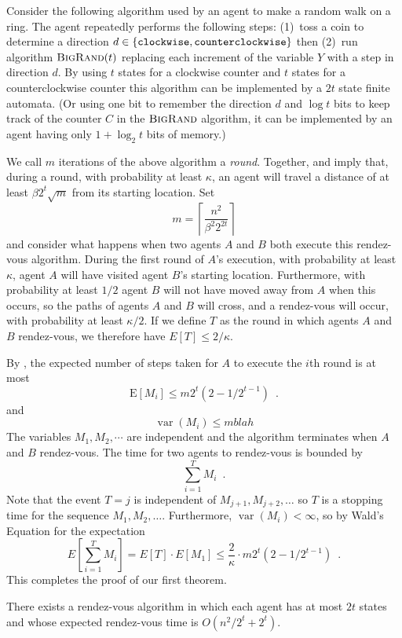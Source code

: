 \documentclass[lotsofwhite]{patmorin}
\newcommand{\bigrand}{\textsc{BigRand}}
\newcommand{\E}{\mathrm{E}}
\DeclareMathOperator{\var}{var}
\begin{document}
Consider the following algorithm used by an agent to make a random
walk on a ring.  The agent repeatedly performs the following steps:
(1)~toss a coin to determine a direction
$d\in\{\mbox{{\tt clockwise}},\mbox{{\tt counterclockwise}}\}$ then (2)~run
algorithm $\bigrand(t)$ replacing each increment of the variable
$Y$ with a step in direction $d$.  By using  $t$ states for 
a clockwise counter and $t$ states for a counterclockwise counter this algorithm
can be implemented by a $2t$ state finite automata. (Or using 
one bit to remember the
direction $d$ and $\log t$ bits to keep track of the counter $C$ in the
$\bigrand$ algorithm, it can be implemented by an agent
having only $1+\log_2 t$ bits of memory.) 

We call $m$ iterations of the above algorithm a \emph{round}.
Together,  and  imply that, during a
round, with probability at least $\kappa$, an agent will travel a
distance of at least $\beta 2^t \sqrt{m}$ from its starting
location.  Set
\[
   m= \left\lceil \frac{n^2}{\beta^2 2^{2t}} \right\rceil 
\]
and consider what happens when two agents $A$ and $B$ both execute
this rendez-vous algorithm.  During the first round of $A$'s
execution, with probability at least $\kappa$, agent $A$ will have
visited agent $B$'s starting location. Furthermore, with probability
at least $1/2$ agent $B$ will not have moved away from $A$ when this
occurs, so the paths of agents $A$ and $B$ will cross, and a
rendez-vous will occur, with probability at least $\kappa/2$.  If we
define $T$ as the round in which agents $A$ and $B$ rendez-vous, we
therefore have $E[T]\le 2/\kappa$.

By , the expected number of steps taken for $A$ to
execute the $i$th round is at most
\[
    \E[M_i] \le m 2^{t}(2-1/2^{t-1}) \enspace . 
\]
and
\[
    \var(M_i) \le m blah
\]
The variables $M_1,M_2,\cdots$ are independent and the algorithm
terminates when $A$ and $B$ rendez-vous.  The time for two agents to
rendez-vous is bounded by 
\[
   \sum_{i=1}^T M_i \enspace .
\]
Note that the event $T=j$ is independent of $M_{j+1},M_{j+2},\ldots$
so $T$ is a stopping time for the sequence
$M_1,M_2,\ldots$.  Furthermore, $\var(M_i)<\infty$, so by Wald's
Equation for the expectation
\[
   E\left[\sum_{i=1}^T M_i\right] = E[T]\cdot E[M_1] 
     \le \frac{2}{\kappa}\cdot m 2^{t}(2-1/2^{t-1}) \enspace .
\]
This completes the proof of our first theorem.
\begin{thm}
There exists a rendez-vous algorithm in which each agent has at most
$2t$ states and whose expected rendez-vous time is
$O(n^2/2^{t} + 2^{t})$.
\end{thm}
\end{document}
